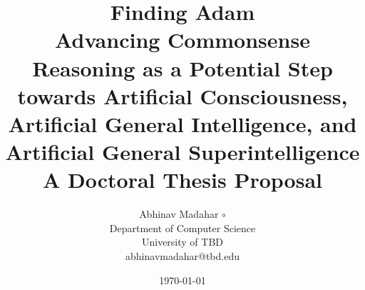 \title{
    {\huge \textbf{Finding Adam}} \\
    Advancing Commonsense Reasoning as a Potential Step towards Artificial Consciousness, Artificial General Intelligence, and Artificial General Superintelligence
    \vspace{1cm} \\
    A Doctoral Thesis Proposal}

\author{
    Abhinav Madahar $\circ$ {}  \\
    Department of Computer Science \\
    University of TBD \\
    {\small abhinavmadahar@tbd.edu}}

\date{\today}
